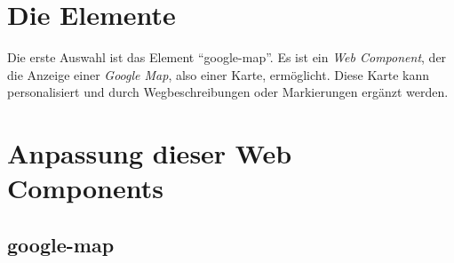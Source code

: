 \documentclass[12pt, paper=a4, bibtotoc, toc=listof, headsepline=true]{scrreprt}
\begin{document}
	\section{Die Elemente}
	Die erste Auswahl ist das Element \enquote{google-map}. Es ist ein \emph{Web Component}, der die Anzeige einer \emph{Google Map}, also einer Karte, ermöglicht. Diese Karte kann personalisiert und durch Wegbeschreibungen oder Markierungen ergänzt werden.\cite{gooMap}
	
	\section{Anpassung dieser Web Components}
		\subsection{google-map}
\end{document}
